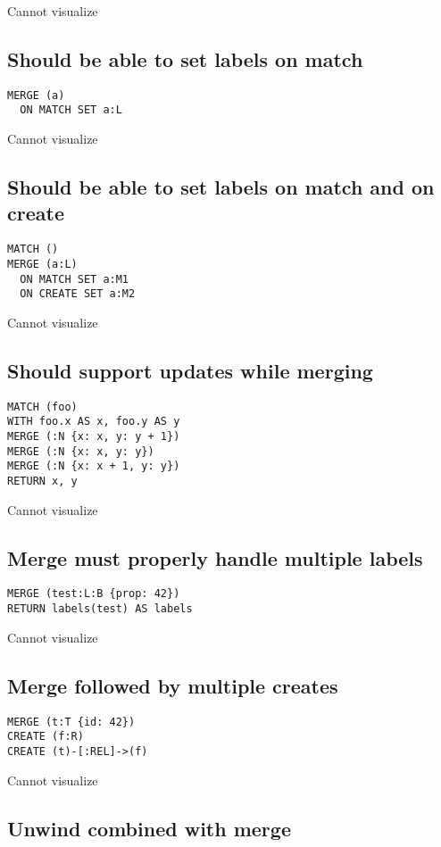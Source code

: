Cannot visualize
\subsection{Should be able to set labels on match}

\begin{lstlisting}
MERGE (a)
  ON MATCH SET a:L
\end{lstlisting}

Cannot visualize
\subsection{Should be able to set labels on match and on create}

\begin{lstlisting}
MATCH ()
MERGE (a:L)
  ON MATCH SET a:M1
  ON CREATE SET a:M2
\end{lstlisting}

Cannot visualize
\subsection{Should support updates while merging}

\begin{lstlisting}
MATCH (foo)
WITH foo.x AS x, foo.y AS y
MERGE (:N {x: x, y: y + 1})
MERGE (:N {x: x, y: y})
MERGE (:N {x: x + 1, y: y})
RETURN x, y
\end{lstlisting}

Cannot visualize
\subsection{Merge must properly handle multiple labels}

\begin{lstlisting}
MERGE (test:L:B {prop: 42})
RETURN labels(test) AS labels
\end{lstlisting}

Cannot visualize
\subsection{Merge followed by multiple creates}

\begin{lstlisting}
MERGE (t:T {id: 42})
CREATE (f:R)
CREATE (t)-[:REL]->(f)
\end{lstlisting}

Cannot visualize
\subsection{Unwind combined with merge}

